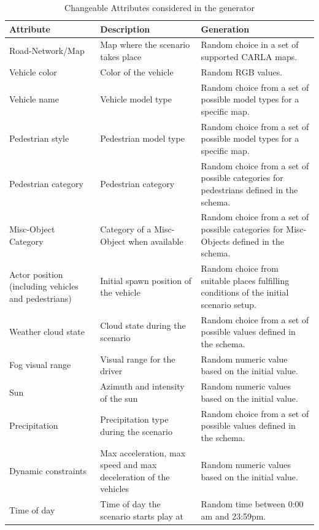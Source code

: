 \documentclass[conference, a4paper, 11pt]{IEEEtran}
\begin{document}
\begin{table}
	\renewcommand{\arraystretch}{1.2}
	\caption{Changeable Attributes considered in the generator}
	\label{attribute_table}
	\centering
	\begin{tabularx}{\linewidth}{p{2cm}|p{2cm}|p{3.5cm}}
		\hline
		\bfseries Attribute & \bfseries Description & \bfseries Generation \\
		\hline\hline
		Road-Network/Map & Map where the scenario takes place & Random choice in a set of supported CARLA maps.  \\ \hline
		Vehicle color  & Color of the vehicle & Random RGB values. \\ \hline
		Vehicle name & Vehicle model type & Random choice from  a set of possible model types for a specific map. \\ \hline
		Pedestrian style & Pedestrian model type & Random choice from  a set of possible model types for a specific map. \\ \hline
		Pedestrian category & Pedestrian category & Random choice from a set of possible categories for pedestrians defined in the schema. \\ \hline
		Misc-Object Category & Category of a Misc-Object when available & Random choice from a set of possible categories for Misc-Objects defined in the schema. \\ \hline
		Actor position (including vehicles and pedestrians) & Initial spawn position of the vehicle & Random choice from suitable places fulfilling conditions of the initial scenario setup. \\ \hline
		Weather cloud state & Cloud state during the scenario & Random choice from a set of possible values defined in the schema. \\ \hline
		Fog visual range & Visual range for the driver & Random numeric value based on the initial value. \\ \hline
		Sun & Azimuth and intensity of the sun & Random numeric values based on the initial value. \\ \hline
		Precipitation & Precipitation type during the scenario & Random choice from a set of possible values defined in the schema. \\ \hline
		Dynamic constraints & Max acceleration, max speed and max deceleration of the vehicles  & Random numeric values based on the initial value. \\ \hline
		Time of day & Time of day the scenario starts play at & Random time between 0:00 am and 23:59pm. \\ \hline
	\end{tabularx}
\end{table}
\end{document}
